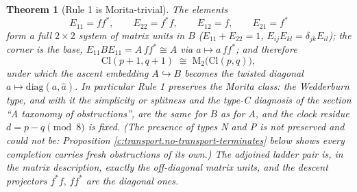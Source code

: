 \documentclass[11pt]{article}
\newtheorem{theorem}{Theorem}[section]
\theoremstyle{definition}
\theoremstyle{plain}
\newcommand{\changedmark}[2]{\marginpar{\raggedright\scriptsize\color{#1}#2}}
\providecommand{\Cl}{}\renewcommand{\Cl}{\mathrm{Cl}}
\providecommand{\Mat}{}\renewcommand{\Mat}{\mathrm{M}}
\begin{document}
\begin{theorem}[Rule 1 is Morita-trivial]\label{c:transport.rule-1-morita-trivial}
\changedmark{gray}{reworded}
The elements
\[
E_{11} = ff^*, \qquad E_{22} = f^*f, \qquad E_{12} = f, \qquad E_{21} = f^*
\]
form a full $2 \times 2$ system of matrix units in $B$ ($E_{11} + E_{22} = 1$, $E_{ij}E_{kl} = \delta_{jk}E_{il}$); the corner is the base, $E_{11} B E_{11} = A\,ff^* \cong A$ via $a \mapsto a\,ff^*$; and therefore
\[
\Cl(p{+}1, q{+}1) \;\cong\; \Mat_2\bigl(\Cl(p,q)\bigr),
\]
under which the ascent embedding $A \hookrightarrow B$ becomes the twisted diagonal $a \mapsto \mathrm{diag}(a, \hat{a})$. In particular Rule 1 preserves the Morita class: the Wedderburn type, and with it the simplicity or splitness and the type-C diagnosis of the section ``A taxonomy of obstructions'', are the same for $B$ as for $A$, and the clock residue $d = p - q \pmod 8$ is fixed. (The \emph{presence} of types N and P is not preserved and could not be: Proposition \ref{c:transport.no-transport-terminates} below shows every completion carries fresh obstructions of its own.) The adjoined ladder pair is, in the matrix description, exactly the off-diagonal matrix units, and the descent projectors $f^*f,\, ff^*$ are the diagonal ones.
\end{theorem}
\end{document}
